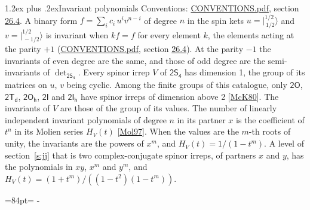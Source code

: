 \documentclass[10pt,a4paper]{article}
\makeatletter
\renewcommand\section{\@startsection{section}{1}{\z@}{-3ex plus -1ex minus -.2ex}%
  {1.2ex plus .2ex}{\normalfont\large\sffamily\bfseries\color{parttitle}}}
\newcommand{\needspace}[1]{\par\penalty-100\begingroup\dimen0=#1\relax\dimen2=\pagegoal
  \advance\dimen2-\pagetotal\ifdim\dimen0>\dimen2\relax\ifdim\dimen2>0pt\vfil\break\fi\fi
  \endgroup}
\numberwithin{equation}{section}
\newcommand{\grp}[1]{\mathsf{#1}}
\newcommand{\jm}[2]{\bigl\lvert{}^{#1}_{\,#2}\bigr\rangle}
\makeatother
\begin{document}
\section{Invariant polynomials}\label{s:invariants}
Conventions: \href{../../CONVENTIONS.pdf}{CONVENTIONS.pdf}, section \href{../../CONVENTIONS.pdf\#conv.26.4}{26.4}.
\leavevmode\label{n:local.binary.form}A binary form $f = \sum_i c_i\, u^i v^{n-i}$ of degree $n$ in the spin kets $u = \jm{1/2}{1/2}$ and $v = \jm{1/2}{-1/2}$ is invariant when $k f = f$ for every element $k$, the elements acting at the parity $+1$ (\href{../../CONVENTIONS.pdf}{CONVENTIONS.pdf}, section \href{../../CONVENTIONS.pdf\#conv.26.4}{26.4}). At the parity $-1$ the invariants of even degree are the same, and those of odd degree are the semi-invariants of $\det_{\grp{2S_{4}}}$.
\leavevmode\label{n:function.hilbert}Every spinor irrep $V$ of $\grp{2S_{4}}$ has dimension 1, the group of its matrices on $u$, $v$ being cyclic. Among the finite groups of this catalogue, only $\grp{2O}$, $\grp{2T_{d}}$, $\grp{2O_{h}}$, $\grp{2I}$ and $\grp{2I_{h}}$ have spinor irreps of dimension above 2 [\href{../../../REFERENCES.pdf\#ref.McK80}{McK80}]. The invariants of $V$ are those of the group of its values. \label{n:local.partner.x}The number of linearly independent invariant polynomials of degree $n$ in its partner $x$ is the coefficient of $t^n$ in its Molien series $H_V(t)$ [\href{../../../REFERENCES.pdf\#ref.Mol97}{Mol97}]. When the values are the $m$-th roots of unity, the invariants are the powers of $x^{m}$, and $H_V(t) = 1/(1 - t^{m})$. A level of section~\ref{s:jj} that is two complex-conjugate spinor irreps, of partners $x$ and $y$, has the polynomials in $xy$, $x^{m}$ and $y^{m}$, and $H_V(t) = (1 + t^{m})/((1 - t^{2})(1 - t^{m}))$.
\needspace{84pt}
\end{document}
